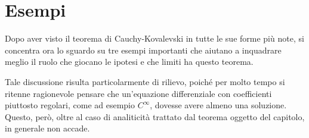 \section{Esempi}
Dopo aver visto il teorema di Cauchy-Kovalevski in tutte le sue forme più note, si concentra ora lo sguardo su tre esempi importanti 
che aiutano a inquadrare meglio il ruolo che giocano le ipotesi e che limiti ha questo teorema.

Tale discussione risulta particolarmente di rilievo, poiché per molto tempo si ritenne ragionevole pensare 
che un'equazione differenziale con coefficienti piuttosto regolari, come ad esempio $C^\infty$, dovesse avere almeno una soluzione.
Questo, però, oltre al caso di analiticità trattato dal teorema oggetto del capitolo, in generale non accade.

\setcounter{example}{0}


